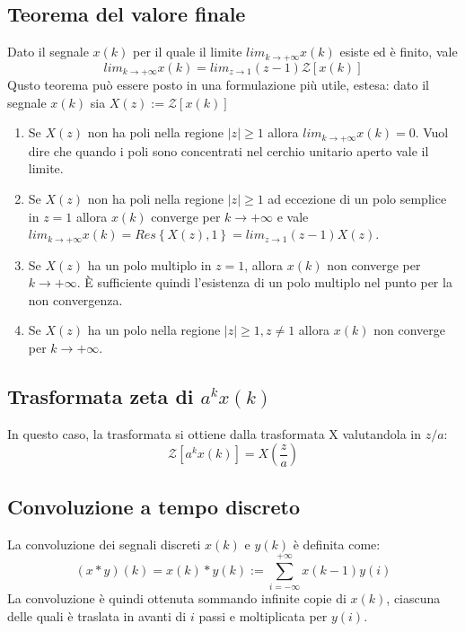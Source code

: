 \documentclass[11pt]{article}
\newcommand{\trz}{\mathcal{Z}}
\begin{document}
\subsection{Teorema del valore finale}
Dato il segnale $x(k)$ per il quale il limite $lim_{k\rightarrow+\infty}x(k)$ esiste ed è finito, vale
\begin{displaymath}
    lim_{k\rightarrow+\infty} x(k) = lim_{z\rightarrow1}(z-1)\trz[x(k)]
\end{displaymath}
Qusto teorema può essere posto in una formulazione più utile, estesa: dato il segnale $x(k)$ sia $X(z) := \trz[x(k)]$
\begin{enumerate}
    \item Se $X(z)$ non ha poli nella regione $|z|\ge1$ allora $lim_{k\rightarrow+\infty} x(k)=0$. Vuol dire che quando i poli sono concentrati nel cerchio unitario aperto vale il limite.
    \item Se $X(z)$ non ha poli nella regione $|z|\ge1$ ad eccezione di un polo semplice in $z=1$ allora $x(k)$ converge per $k\rightarrow+\infty$ e vale $lim_{k\rightarrow+\infty} x(k) = Res\left\{X(z),1\right\} = lim_{z\rightarrow1}(z-1)X(z)$.
    \item Se $X(z)$ ha un polo multiplo in $z=1$, allora $x(k)$ non converge per $k\rightarrow+\infty$. È sufficiente quindi l'esistenza di un polo multiplo nel punto per la non convergenza.
    \item Se $X(z)$ ha un polo nella regione $|z|\ge1, z\neq 1$ allora $x(k)$ non converge per $k\rightarrow+\infty$.
\end{enumerate}
\subsection{Trasformata zeta di $a^kx(k)$}
In questo caso, la trasformata si ottiene dalla trasformata X valutandola in $z/a$:
\begin{displaymath}
    \trz[a^k x(k)] = X\left(\frac{z}{a}\right)
\end{displaymath}
\subsection{Convoluzione a tempo discreto}
La convoluzione dei segnali discreti $x(k)$ e $y(k)$ è definita come:
\begin{displaymath}
    (x*y)(k)=x(k)*y(k) := \sum_{i=-\infty}^{+\infty} x(k-1)y(i)
\end{displaymath}
La convoluzione è quindi ottenuta sommando infinite copie di $x(k)$, ciascuna delle quali è traslata in avanti di $i$ passi e moltiplicata per $y(i)$. 
\end{document}
